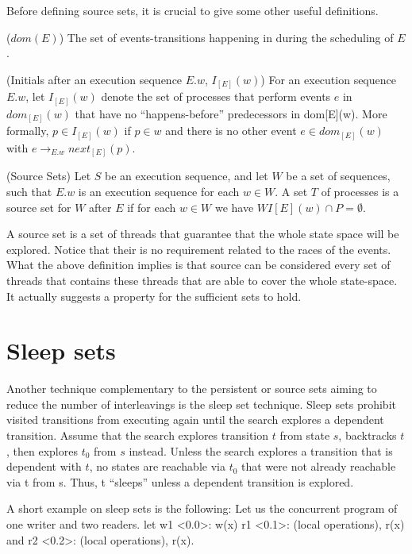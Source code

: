 Before defining source sets, it is crucial to give some other useful definitions.

\begin{definition}{($dom(E)$)}
    The set of events-transitions happening in during the scheduling of $E$.
\end{definition}

\begin{definition}{(Initials after an execution sequence $E.w$, $I_{[E]}(w)$)}
For an execution sequence $E.w$, let $I_{[E]}(w)$ denote the set of
processes that perform events $e$ in $dom_{[E]}(w)$ that have no
“happens-before” predecessors in dom[E](w). More formally,
$p \in I_{[E]}(w)$ if $p \in w$ and there is no other event $e \in dom_{[E]}(w)$ with
$e \rightarrow_{E.w} next_{[E]}(p)$.
\end{definition}

\begin{definition}{(Source Sets)}
Let $S$ be an execution sequence,
and let $W$ be a set of sequences, such that $E.w$ is an execution
sequence for each $w \in W$. A set $T$ of processes is a source set for
$W$ after $E$ if for each $w \in W$ we have $WI [E] (w) \cap P  = \emptyset$.
\end{definition}

A source set is a set of threads that guarantee that the whole state space will be explored. Notice that their is no requirement related to the races
of the events.
What the above definition implies is that source can be considered every set of threads that contains these threads that are able to cover the whole state-space.
It actually suggests a property for the sufficient sets to hold.

\section{Sleep sets}

Another technique complementary to the persistent or source sets aiming to reduce the number of interleavings is the sleep set technique.
Sleep sets prohibit visited transitions from executing again
until the search explores a dependent transition. Assume that
the search explores transition $t$ from state $s$, backtracks $t$,
then explores $t_0$ from $s$ instead. Unless the search explores
a transition that is dependent with $t$, no states are reachable
via $t_0$ that were not already reachable via t from s. Thus, t
“sleeps” unless a dependent transition is explored.

A short example on sleep sets is the following:
Let us the concurrent program of one writer and two readers.
let w1 <0.0>: w(x) r1 <0.1>: (local operations), r(x) and r2 <0.2>: (local operations), r(x).

